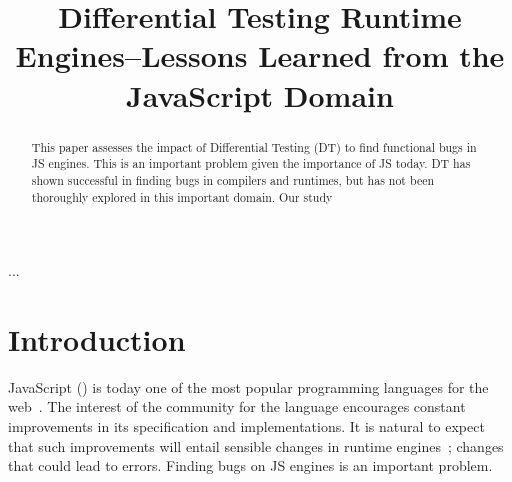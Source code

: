 \documentclass[10pt,conference,anonymous]{IEEEtran}
\begin{document}
\title{Differential Testing Runtime Engines--Lessons Learned from the
  JavaScript Domain}


\maketitle

\thispagestyle{plain}
\pagestyle{plain}

\begin{abstract}
This paper assesses the impact of Differential Testing (DT) to find
functional bugs in JS engines. This is an important problem given the
importance of JS today. DT has shown successful in finding bugs in
compilers and runtimes, but has not been thoroughly explored in this
important domain. Our study 
\end{abstract}

\begin{IEEEkeywords}
...
\end{IEEEkeywords}

\section{Introduction}

JavaScript (\js{}) is today one of the most popular programming
languages for the web~\cite{business-insider,stackify}. The interest
of the community for the language encourages constant improvements in
its specification and implementations. It is natural to expect that
such improvements will entail sensible changes in runtime
engines~\cite{kangax}; changes that could lead to errors. Finding bugs
on JS engines is an important problem. 
\end{document}
